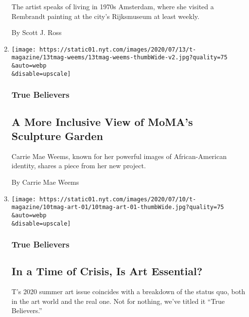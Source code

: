 \begin{enumerate}
  The artist speaks of living in 1970s Amsterdam, where she visited a
  Rembrandt painting at the city's Rijksmuseum at least weekly.

  By Scott J. Ross
\item
  \href{/2020/07/21/t-magazine/carrie-mae-weems-moma-garden.html}{}

  \texttt{[image: https://static01.nyt.com/images/2020/07/13/t-magazine/13tmag-weems/13tmag-weems-thumbWide-v2.jpg?quality=75\\\&auto=webp\\\&disable=upscale]}

  \hypertarget{true-believers-9}{%
  \subsubsection{True Believers}\label{true-believers-9}}

  \hypertarget{a-more-inclusive-view-of-momas-sculpture-garden}{%
  \subsection{A More Inclusive View of MoMA's Sculpture
  Garden}\label{a-more-inclusive-view-of-momas-sculpture-garden}}

  Carrie Mae Weems, known for her powerful images of African-American
  identity, shares a piece from her new project.

  By Carrie Mae Weems
\item
  \href{/2020/07/20/t-magazine/museums-galleries-open-art.html}{}

  \texttt{[image: https://static01.nyt.com/images/2020/07/10/t-magazine/10tmag-art-01/10tmag-art-01-thumbWide.jpg?quality=75\\\&auto=webp\\\&disable=upscale]}

  \hypertarget{true-believers-10}{%
  \subsubsection{True Believers}\label{true-believers-10}}

  \hypertarget{in-a-time-of-crisis-is-art-essential-1}{%
  \subsection{In a Time of Crisis, Is Art
  Essential?}\label{in-a-time-of-crisis-is-art-essential-1}}

  T's 2020 summer art issue coincides with a breakdown of the status
  quo, both in the art world and the real one. Not for nothing, we've
  titled it ``True Believers.''


\end{enumerate}
